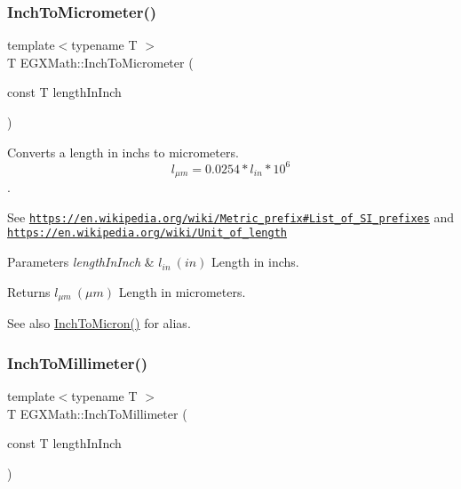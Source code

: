 \subsubsection{\texorpdfstring{Inch\+To\+Micrometer()}{InchToMicrometer()}}
{\footnotesize\ttfamily template$<$typename T $>$ \\
T E\+G\+X\+Math\+::\+Inch\+To\+Micrometer (\begin{DoxyParamCaption}\item[{const T}]{length\+In\+Inch }\end{DoxyParamCaption})}



Converts a length in inchs to micrometers. \[ l_{\mu m}=0.0254 * l_{in} * 10^{6} \]. 

See \href{https://en.wikipedia.org/wiki/Metric_prefix#List_of_SI_prefixes}{\tt https\+://en.\+wikipedia.\+org/wiki/\+Metric\+\_\+prefix\#\+List\+\_\+of\+\_\+\+S\+I\+\_\+prefixes} and \href{https://en.wikipedia.org/wiki/Unit_of_length}{\tt https\+://en.\+wikipedia.\+org/wiki/\+Unit\+\_\+of\+\_\+length} 
\begin{DoxyParams}{Parameters}
{\em length\+In\+Inch} & $ l_{in}\ (in)$ Length in inchs. \\
\hline
\end{DoxyParams}
\begin{DoxyReturn}{Returns}
$ l_{\mu m}\ (\mu m)$ Length in micrometers. 
\end{DoxyReturn}
\begin{DoxySeeAlso}{See also}
\mbox{\hyperlink{group___e_g_x_math-_conversions-_length_conversions-_imperial-_inch-_non-_s_i_ga28d3076041cdf54ce5c25f834fb16128}{Inch\+To\+Micron()}} for alias. 
\end{DoxySeeAlso}
\mbox{\label{group___e_g_x_math-_conversions-_length_conversions-_imperial-_inch-_s_i_ga62adb6084de8b6ff26107bdfeb4144f2}} 
\subsubsection{\texorpdfstring{Inch\+To\+Millimeter()}{InchToMillimeter()}}
{\footnotesize\ttfamily template$<$typename T $>$ \\
T E\+G\+X\+Math\+::\+Inch\+To\+Millimeter (\begin{DoxyParamCaption}\item[{const T}]{length\+In\+Inch }\end{DoxyParamCaption})}



